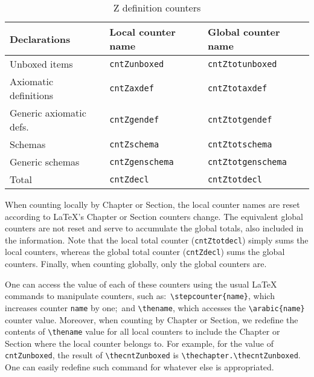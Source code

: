 \documentclass{article}
\begin{document}
\begin{table}[ht]
    \centering
    \begin{tabular}{|l|l|l|}
        \hline
        \textbf{Declarations}   & \textbf{Local counter name}    & \textbf{Global counter name} \\
        \hline
        Unboxed items           & \texttt{cntZunboxed}           & \texttt{cntZtotunboxed} \\
        \hline
        Axiomatic definitions   & \texttt{cntZaxdef}             & \texttt{cntZtotaxdef} \\
        \hline
        Generic axiomatic defs. & \texttt{cntZgendef}            & \texttt{cntZtotgendef} \\
        \hline
        Schemas                 & \texttt{cntZschema}            & \texttt{cntZtotschema} \\
        \hline
        Generic schemas         & \texttt{cntZgenschema}         & \texttt{cntZtotgenschema} \\
        \hline
        Total                   & \texttt{cntZdecl}              & \texttt{cntZtotdecl} \\
        \hline
    \end{tabular}
    \caption{Z definition counters}\label{tbl:cztcount}
\end{table}
%
When counting locally by Chapter or Section, the local counter names are reset according
to \LaTeX's Chapter or Section counters change. The equivalent global counters are not
reset and serve to accumulate the global totals, also included in the information. Note 
that the local total counter (\texttt{cntZtotdecl}) simply sums the local counters, whereas
the global total counter (\texttt{cntZdecl}) sums the global counters. Finally, when 
counting globally, only the global counters are.

One can access the value of each of these counters using the usual \LaTeX{} commands
to manipulate counters, such as:~\verb|\stepcounter{name}|, which increases counter 
\texttt{name} by one;~and \verb|\thename|, which accesses the \verb|\arabic{name}| counter value.
Moreover, when counting by Chapter or Section, we redefine the contents of \verb|\thename| value
for all local counters to include the Chapter or Section where the local counter belongs to. For
example, for the value of \texttt{cntZunboxed}, the result of \verb|\thecntZunboxed| is 
\verb|\thechapter.\thecntZunboxed|. One can easily redefine such command for whatever else is
appropriated.
\end{document}
